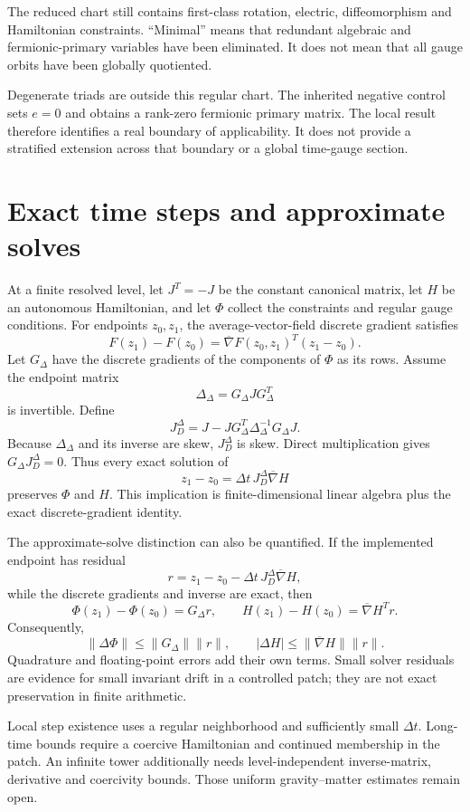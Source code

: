 The reduced chart still contains first-class rotation, electric, diffeomorphism and Hamiltonian constraints. ``Minimal'' means that redundant algebraic and fermionic-primary variables have been eliminated. It does not mean that all gauge orbits have been globally quotiented.

Degenerate triads are outside this regular chart. The inherited negative control sets \(e=0\) and obtains a rank-zero fermionic primary matrix. The local result therefore identifies a real boundary of applicability. It does not provide a stratified extension across that boundary or a global time-gauge section.

\clearpage
\section{Exact time steps and approximate solves}\label{c:verify:step}

At a finite resolved level, let \(J^T=-J\) be the constant canonical matrix, let \(H\) be an autonomous Hamiltonian, and let \(\Phi\) collect the constraints and regular gauge conditions. For endpoints \(z_0,z_1\), the average-vector-field discrete gradient satisfies
\[
 F(z_1)-F(z_0)
 =\overline\nabla F(z_0,z_1)^T(z_1-z_0).
\]
Let \(G_\Delta\) have the discrete gradients of the components of \(\Phi\) as its rows. Assume the endpoint matrix
\[
 \Delta_\Delta=G_\Delta JG_\Delta^T
\]
is invertible. Define
\[
 J_D^\Delta
 =J-JG_\Delta^T\Delta_\Delta^{-1}G_\Delta J.
\]
Because \(\Delta_\Delta\) and its inverse are skew, \(J_D^\Delta\) is skew. Direct multiplication gives \(G_\Delta J_D^\Delta=0\). Thus every exact solution of
\[
 z_1-z_0=\Delta t\,J_D^\Delta\overline\nabla H
\]
preserves \(\Phi\) and \(H\). This implication is finite-dimensional linear algebra plus the exact discrete-gradient identity.

The approximate-solve distinction can also be quantified. If the implemented endpoint has residual
\[
 r=z_1-z_0-\Delta t\,J_D^\Delta\overline\nabla H,
\]
while the discrete gradients and inverse are exact, then
\[
 \Phi(z_1)-\Phi(z_0)=G_\Delta r,
 \qquad
 H(z_1)-H(z_0)=\overline\nabla H^Tr.
\]
Consequently,
\[
 \|\Delta\Phi\|\le\|G_\Delta\|\|r\|,
 \qquad
 |\Delta H|\le\|\overline\nabla H\|\|r\|.
\]
Quadrature and floating-point errors add their own terms. Small solver residuals are evidence for small invariant drift in a controlled patch; they are not exact preservation in finite arithmetic.

Local step existence uses a regular neighborhood and sufficiently small \(\Delta t\). Long-time bounds require a coercive Hamiltonian and continued membership in the patch. An infinite tower additionally needs level-independent inverse-matrix, derivative and coercivity bounds. Those uniform gravity--matter estimates remain open.

